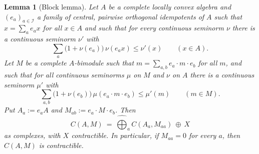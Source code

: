 \documentclass[11pt]{amsart}
\newtheorem{lemma}[theorem]{Lemma}
\theoremstyle{definition}
\theoremstyle{remark}
\begin{document}
\begin{lemma}[Block lemma]\label{lem:block}
Let $A$ be a complete locally convex algebra and $(e_a)_{a\in\mathcal I}$ a
family of central, pairwise orthogonal idempotents of $A$ such that
$x=\sum_ae_ax$ for all $x\in A$ and such that for every continuous seminorm
$\nu$ there is a continuous seminorm $\nu'$ with
\begin{equation}\label{eq:blockA}
\sum_a\bigl(1+\nu(e_a)\bigr)\,\nu(e_ax)\le\nu'(x)\qquad(x\in A).
\end{equation}
Let $M$ be a complete $A$-bimodule such that $m=\sum_{a,b}e_a\cdot m\cdot e_b$
for all $m$, and such that for all continuous seminorms $\mu$ on $M$ and $\nu$
on $A$ there is a continuous seminorm $\mu'$ with
\begin{equation}\label{eq:blockM}
\sum_{a,b}\bigl(1+\nu(e_b)\bigr)\,\mu(e_a\cdot m\cdot e_b)\le\mu'(m)\qquad(m\in M).
\end{equation}
Put $A_a:=e_aA$ and $M_{ab}:=e_a\cdot M\cdot e_b$.  Then
\[
C(A,M)\ =\ \widehat\bigoplus_{a}C(A_a,M_{aa})\ \oplus\ X
\]
as complexes, with $X$ contractible.  In particular, if $M_{aa}=0$ for every
$a$, then $C(A,M)$ is contractible.
\end{lemma}
\end{document}
